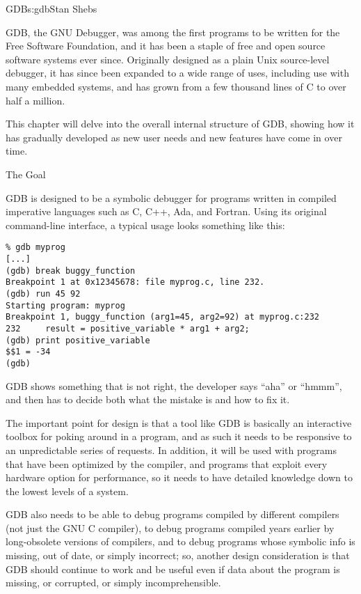 \begin{aosachapter}{GDB}{s:gdb}{Stan Shebs}

GDB, the GNU Debugger, was among the first programs to be written for
the Free Software Foundation, and it has been a staple of free and
open source software systems ever since.  Originally designed as a
plain Unix source-level debugger, it has since been expanded to a wide
range of uses, including use with many embedded systems, and has grown from
a few thousand lines of C to over half a million.

This chapter will delve into the overall internal structure of GDB,
showing how it has gradually developed as new user needs and new
features have come in over time.

\begin{aosasect1}{The Goal}

GDB is designed to be a symbolic debugger for programs written in
compiled imperative languages such as C, C++, Ada, and Fortran.  Using its original command-line interface, a typical usage
looks something like this:
\begin{verbatim}
% gdb myprog
[...]
(gdb) break buggy_function
Breakpoint 1 at 0x12345678: file myprog.c, line 232.
(gdb) run 45 92
Starting program: myprog
Breakpoint 1, buggy_function (arg1=45, arg2=92) at myprog.c:232
232     result = positive_variable * arg1 + arg2;
(gdb) print positive_variable
$$1 = -34
(gdb)
\end{verbatim}
GDB shows something that is not right, the developer says ``aha''
or ``hmmm'', and then has to decide both what the mistake is and how
to fix it.

The important point for design is that a tool like GDB is basically an
interactive toolbox for poking around in a program, and as such it
needs to be responsive to an unpredictable series of requests.  In
addition, it will be used with programs that have been optimized by
the compiler, and programs that exploit every hardware option for
performance, so it needs to have detailed knowledge down to the lowest
levels of a system.

GDB also needs to be able to debug programs compiled by different
compilers (not just the GNU C compiler), to debug programs compiled
years earlier by long-obsolete versions of compilers, and to debug
programs whose symbolic info is missing, out of date, or simply
incorrect; so, another design consideration is that GDB should
continue to work and be useful even if data about the program is
missing, or corrupted, or simply incomprehensible.


\end{aosasect1}
\end{aosachapter}
